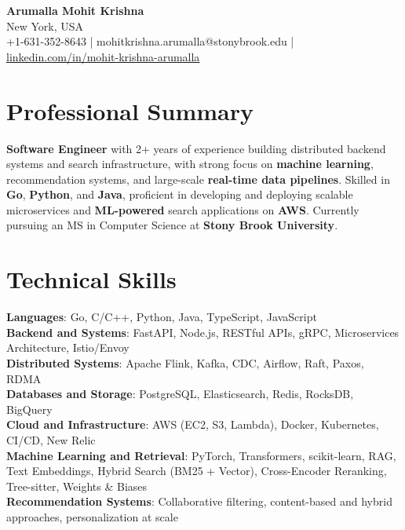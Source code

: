 \documentclass[letterpaper,11pt]{article}
\begin{document}
\begin{center}
  {\Large \textbf{Arumalla Mohit Krishna}} \\
  New York, USA \\
  +1-631-352-8643 \enspace | \enspace mohitkrishna.arumalla@stonybrook.edu \enspace | \enspace \href{https://www.linkedin.com/in/mohit-krishna-arumalla}{linkedin.com/in/mohit-krishna-arumalla}
\end{center}

\section{Professional Summary}
  \begin{itemize}[leftmargin=0.15in, label={}]
    \small{\item{
     \textbf{Software Engineer} with 2+ years of experience building distributed backend systems and search infrastructure, with strong focus on \textbf{machine learning}, recommendation systems, and large-scale \textbf{real-time data pipelines}. Skilled in \textbf{Go}, \textbf{Python}, and \textbf{Java}, proficient in developing and deploying scalable microservices and \textbf{ML-powered} search applications on \textbf{AWS}. Currently pursuing an MS in Computer Science at \textbf{Stony Brook University}.
    }}
  \end{itemize}
\vspace{-16pt}

\section{Technical Skills}
 \begin{itemize}[leftmargin=0.15in, label={}]
    \small{\item{
     \textbf{Languages}: Go, C/C++, Python, Java, TypeScript, JavaScript \\
     \textbf{Backend and Systems}: FastAPI, Node.js, RESTful APIs, gRPC, Microservices Architecture, Istio/Envoy \\
     \textbf{Distributed Systems}: Apache Flink, Kafka, CDC, Airflow, Raft, Paxos, RDMA \\
     \textbf{Databases and Storage}: PostgreSQL, Elasticsearch, Redis, RocksDB, BigQuery \\
     \textbf{Cloud and Infrastructure}: AWS (EC2, S3, Lambda), Docker, Kubernetes, CI/CD, New Relic \\
     \textbf{Machine Learning and Retrieval}: PyTorch, Transformers, scikit-learn, RAG, Text Embeddings, Hybrid Search (BM25 + Vector), Cross-Encoder Reranking, Tree-sitter, Weights \& Biases \\
     \textbf{Recommendation Systems}: Collaborative filtering, content-based and hybrid approaches, personalization at scale
    }}
 \end{itemize}
\vspace{-16pt}
\end{document}
